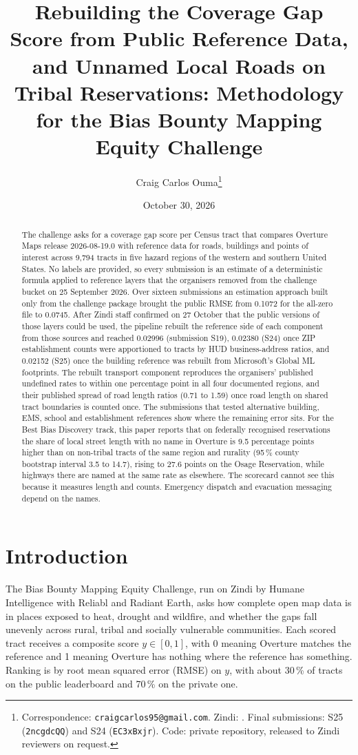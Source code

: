 \documentclass[11pt]{article}
\title{\textbf{Rebuilding the Coverage Gap Score from Public Reference
Data, and Unnamed Local Roads on Tribal Reservations: Methodology for the
Bias Bounty Mapping Equity Challenge}}
\author[1]{Craig Carlos Ouma\thanks{%
Correspondence: \texttt{craigcarlos95@gmail.com}. Zindi: \zindiuser. Final
submissions: S25 (\texttt{2ncgdcQQ}) and S24 (\texttt{EC3xBxjr}). Code:
private repository, released to Zindi reviewers on request.}}
\affil[1]{Independent Researcher}
\date{October 30, 2026}
\begin{document}
\maketitle

\begin{abstract}
\noindent
The challenge asks for a coverage gap score per Census tract that compares
Overture Maps release 2026-08-19.0 with reference data for roads, buildings
and points of interest across 9,794 tracts in five hazard regions of the
western and southern United States. No labels are provided, so every
submission is an estimate of a deterministic formula applied to reference
layers that the organisers removed from the challenge bucket on 25 September
2026. Over sixteen submissions an estimation approach built only from the
challenge package brought the public RMSE from 0.1072 for the all-zero file to
0.0745. After Zindi staff confirmed on 27 October that the public versions of
those layers could be used, the pipeline rebuilt the reference side of each component from those sources and
reached 0.02996 (submission S19), 0.02380 (S24) once ZIP establishment
counts were apportioned to tracts by HUD business-address ratios, and 0.02152
(S25) once the building reference was rebuilt from Microsoft's Global ML
footprints. The rebuilt
transport component reproduces
the organisers' published undefined rates to within one percentage point in
all four documented regions, and their published spread of road length ratios
(0.71 to 1.59) once road length on shared tract boundaries is counted once.
The submissions that tested alternative building, EMS, school and
establishment references show where the remaining error sits.
For the Best Bias Discovery track, this paper reports that on federally
recognised reservations the share of local street length with no name in
Overture is 9.5 percentage points higher than on non-tribal tracts of the same
region and rurality (95\,\% county bootstrap interval 3.5 to 14.7), rising to
27.6 points on the Osage Reservation, while highways there are named at the
same rate as elsewhere. The scorecard cannot see this because it measures
length and counts. Emergency dispatch and evacuation messaging depend on the
names.
\end{abstract}

\section{Introduction}
\label{sec:intro}

The Bias Bounty Mapping Equity Challenge, run on Zindi by Humane Intelligence
with Reliabl and Radiant Earth, asks how complete open map data is in places
exposed to heat, drought and wildfire, and whether the gaps fall unevenly
across rural, tribal and socially vulnerable communities. Each scored tract
receives a composite score $y \in [0, 1]$, with 0 meaning Overture matches the
reference and 1 meaning Overture has nothing where the reference has
something. Ranking is by root mean squared error (RMSE) on $y$, with about
30\,\% of tracts on the public leaderboard and 70\,\% on the private one.
\end{document}
